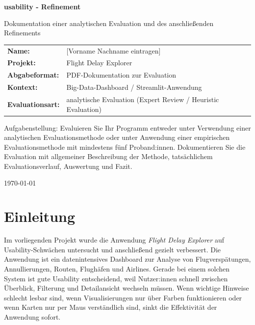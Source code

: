 \documentclass[11pt,a4paper]{article}
\newcommand{\studentname}{[Vorname Nachname eintragen]}
\newcommand{\moduletitle}{usability - Refinement}
\begin{document}
\begin{titlepage}
\centering
\vspace*{2.5cm}
{\Huge\bfseries \moduletitle \par}
\vspace{1.8cm}
{\Large Dokumentation einer analytischen Evaluation und des anschließenden Refinements \par}
\vspace{2.2cm}

\begin{tabular}{ll}
\textbf{Name:} & \studentname \\
\textbf{Projekt:} & Flight Delay Explorer \\
\textbf{Abgabeformat:} & PDF-Dokumentation zur Evaluation \\
\textbf{Kontext:} & Big-Data-Dashboard / Streamlit-Anwendung \\
\textbf{Evaluationsart:} & analytische Evaluation (Expert Review / Heuristic Evaluation) \\
\end{tabular}

\vfill

{\large
Aufgabenstellung: Evaluieren Sie Ihr Programm entweder unter Verwendung einer analytischen Evaluationsmethode oder unter Anwendung einer empirischen Evaluationsmethode mit mindestens fünf Proband:innen. Dokumentieren Sie die Evaluation mit allgemeiner Beschreibung der Methode, tatsächlichem Evaluationsverlauf, Auswertung und Fazit.
\par}

\vspace{1.2cm}
{\large \today \par}
\end{titlepage}

\tableofcontents
\newpage

\section{Einleitung}
Im vorliegenden Projekt wurde die Anwendung \textit{Flight Delay Explorer} auf Usability-Schwächen untersucht und anschließend gezielt verbessert. Die Anwendung ist ein datenintensives Dashboard zur Analyse von Flugverspätungen, Annullierungen, Routen, Flughäfen und Airlines. Gerade bei einem solchen System ist gute Usability entscheidend, weil Nutzer:innen schnell zwischen Überblick, Filterung und Detailansicht wechseln müssen. Wenn wichtige Hinweise schlecht lesbar sind, wenn Visualisierungen nur über Farben funktionieren oder wenn Karten nur per Maus verständlich sind, sinkt die Effektivität der Anwendung sofort.
\end{document}
